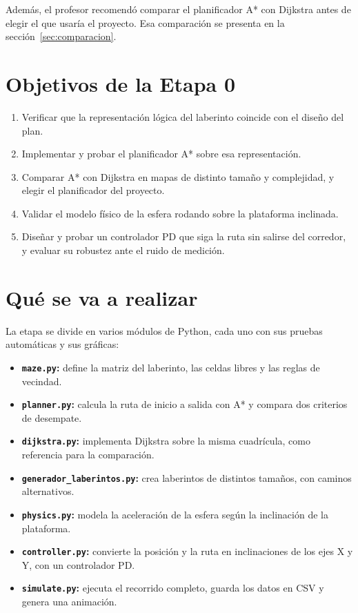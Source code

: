 \documentclass[11pt,a4paper]{article}
\begin{document}
Además, el profesor recomendó comparar el planificador A* con Dijkstra antes de elegir el que usaría el proyecto. Esa comparación se presenta en la sección~\ref{sec:comparacion}.

\section{Objetivos de la Etapa 0}
\begin{enumerate}
    \item Verificar que la representación lógica del laberinto coincide con el diseño del plan.
    \item Implementar y probar el planificador A* sobre esa representación.
    \item Comparar A* con Dijkstra en mapas de distinto tamaño y complejidad, y elegir el planificador del proyecto.
    \item Validar el modelo físico de la esfera rodando sobre la plataforma inclinada.
    \item Diseñar y probar un controlador PD que siga la ruta sin salirse del corredor, y evaluar su robustez ante el ruido de medición.
\end{enumerate}

\section{Qué se va a realizar}
La etapa se divide en varios módulos de Python, cada uno con sus pruebas automáticas y sus gráficas:

\begin{itemize}
    \item \textbf{\texttt{maze.py}:} define la matriz del laberinto, las celdas libres y las reglas de vecindad.
    \item \textbf{\texttt{planner.py}:} calcula la ruta de inicio a salida con A* y compara dos criterios de desempate.
    \item \textbf{\texttt{dijkstra.py}:} implementa Dijkstra sobre la misma cuadrícula, como referencia para la comparación.
    \item \textbf{\texttt{generador\_laberintos.py}:} crea laberintos de distintos tamaños, con caminos alternativos.
    \item \textbf{\texttt{physics.py}:} modela la aceleración de la esfera según la inclinación de la plataforma.
    \item \textbf{\texttt{controller.py}:} convierte la posición y la ruta en inclinaciones de los ejes X y Y, con un controlador PD.
    \item \textbf{\texttt{simulate.py}:} ejecuta el recorrido completo, guarda los datos en CSV y genera una animación.
\end{itemize}
\end{document}
